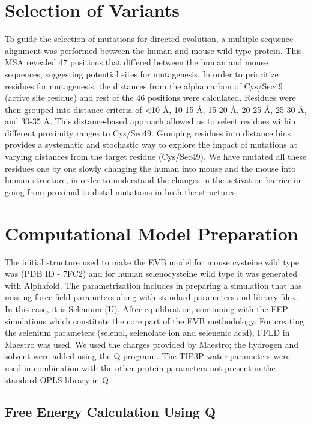\documentclass{article}
\begin{document}
\section{Selection of Variants}

To guide the selection of mutations for directed evolution, a multiple sequence alignment was performed between the human and mouse wild-type protein. This MSA revealed 47 positions that differed between the human and mouse sequences, suggesting potential sites for mutagenesis. In order to prioritize residues for mutagenesis, the distances from the alpha carbon of Cys/Sec49 (active site residue) and rest of the 46 positions were calculated. Residues were then grouped into distance criteria of <10 Å, 10-15 Å, 15-20 Å, 20-25 Å, 25-30 Å, and 30-35 Å. This distance-based approach allowed us to select residues within different proximity ranges to Cys/Sec49. Grouping residues into distance bins provides a systematic and stochastic way to explore the impact of mutations at varying distances from the target residue (Cys/Sec49). We have mutated all these residues one by one slowly changing the human into mouse and the mouse into human structure, in order to understand the changes in the activation barrier in going from proximal to distal mutations in both the structures.

\section{Computational Model Preparation}

The initial structure used to make the EVB model for mouse cysteine wild type was (PDB ID - 7FC2) and for human selenocysteine wild type it was generated with Alphafold. The parametrization includes in preparing a simulation that has missing force field parameters along with standard parameters and library files. In this case, it is Selenium (U). After equilibration, continuing with the FEP simulations which constitute the core part of the EVB methodology. For creating the selenium parameters (selenol, selenolate ion and selenenic acid), FFLD in Maestro was used. We used the charges provided by Maestro; the hydrogen and solvent were added using the Q program \cite{Marelius1999}. The TIP3P water parameters were used in combination with the other protein parameters not present in the standard OPLS library in Q.

\subsection{Free Energy Calculation Using Q}
\end{document}
